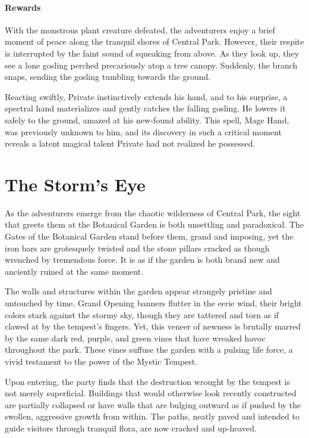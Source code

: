 \paragraph*{Rewards}
With the monstrous plant creature defeated, the adventurers enjoy a brief moment of peace along the tranquil shores of Central Park. However, their respite is interrupted by the faint sound of squeaking from above. As they look up, they see a lone gosling perched precariously atop a tree canopy. Suddenly, the branch snaps, sending the gosling tumbling towards the ground.

Reacting swiftly, Private instinctively extends his hand, and to his surprise, a spectral hand materializes and gently catches the falling gosling. He lowers it safely to the ground, amazed at his new-found ability. This spell, Mage Hand, was previously unknown to him, and its discovery in such a critical moment reveals a latent magical talent Private had not realized he possessed.

\section*{The Storm's Eye}
As the adventurers emerge from the chaotic wilderness of Central Park, the sight that greets them at the Botanical Garden is both unsettling and paradoxical. The Gates of the Botanical Garden stand before them, grand and imposing, yet the iron bars are grotesquely twisted and the stone pillars cracked as though wrenched by tremendous force. It is as if the garden is both brand new and anciently ruined at the same moment.

The walls and structures within the garden appear strangely pristine and untouched by time. Grand Opening banners flutter in the eerie wind, their bright colors stark against the stormy sky, though they are tattered and torn as if clawed at by the tempest's fingers. Yet, this veneer of newness is brutally marred by the same dark red, purple, and green vines that have wreaked havoc throughout the park. These vines suffuse the garden with a pulsing life force, a vivid testament to the power of the Mystic Tempest.

Upon entering, the party finds that the destruction wrought by the tempest is not merely superficial. Buildings that would otherwise look recently constructed are partially collapsed or have walls that are bulging outward as if pushed by the swollen, aggressive growth from within. The paths, neatly paved and intended to guide visitors through tranquil flora, are now cracked and up-heaved.

